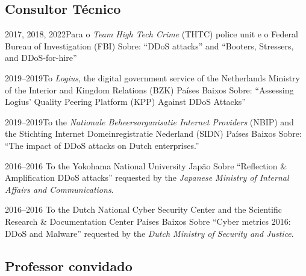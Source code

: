\documentclass[print]{styles/friggeri-cv-mac} %
\begin{document}
\subsection{Consultor Técnico}\vspace{-5pt}
\begin{entrylist}

\entry
{2017, 2018, 2022}{Para o \textit{Team High Tech Crime} (THTC) police unit e o Federal Bureau of Investigation (FBI)}
{Sobre: ``DDoS attacks'' and ``Booters, Stressers, and DDoS-for-hire''}

\entry
{2019--2019}{To \textit{Logius}, the digital government service of the Netherlands Ministry of the Interior and Kingdom Relations (BZK)}
{Países Baixos}
{Sobre: ``Assessing Logius' Quality Peering Platform (KPP) Against DDoS Attacks''}

\entry
{2019--2019}{To the \textit{Nationale Beheersorganisatie Internet Providers} (NBIP) and the Stichting Internet Domeinregistratie Nederland (SIDN)}
{Países Baixos}
{Sobre: ``The impact of DDoS attacks on Dutch enterprises.''}
	
\entry
{2016--2016}
{To the Yokohama National University}
{Japão}
{Sobre ``Reflection \& Amplification DDoS attacks''
requested by the \emph{Japanese Ministry of Internal Affairs and
Communications}.}

\entry
{2016--2016}
{To the Dutch National Cyber Security Center and the Scientific Research \& Documentation Center}
{Países Baixos}
{Sobre ``Cyber metrics 2016: DDoS and Malware'' requested by the \emph{Dutch Ministry of Security and Justice}.} 

\end{entrylist}


\subsection{Professor convidado}\vspace{-5pt}

\end{document}
